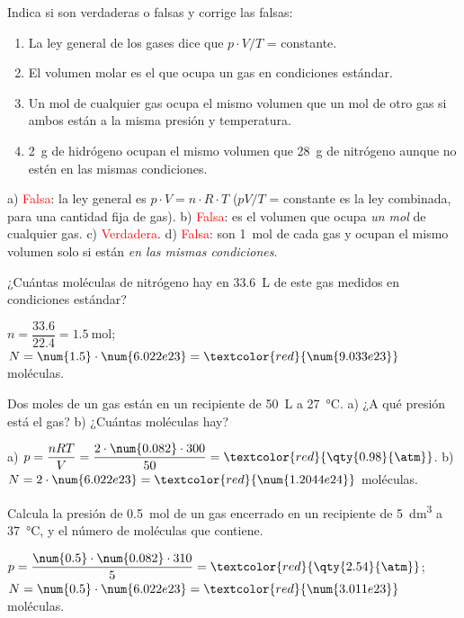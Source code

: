 \begin{exercise}
    Indica si son verdaderas o falsas y corrige las falsas:
    \begin{enumerate}[label=\alph*)]
        \item La ley general de los gases dice que \(p \cdot V / T\) = constante.
        \item El volumen molar es el que ocupa un gas en condiciones estándar.
        \item Un mol de cualquier gas ocupa el mismo volumen que un mol de otro gas si ambos están a la misma presión y temperatura.
        \item \qty{2}{\gram} de hidrógeno ocupan el mismo volumen que \qty{28}{\gram} de nitrógeno aunque no estén en las mismas condiciones.
    \end{enumerate}
    \begin{solu}
        a) \textcolor{red}{Falsa}: la ley general es \(p \cdot V = n \cdot R \cdot T\) (\(pV/T\) = constante es la ley combinada, para una cantidad fija de gas). b) \textcolor{red}{Falsa}: es el volumen que ocupa \emph{un mol} de cualquier gas. c) \textcolor{red}{Verdadera}. d) \textcolor{red}{Falsa}: son \qty{1}{\mol} de cada gas y ocupan el mismo volumen solo si están \emph{en las mismas condiciones}.
    \end{solu}
\end{exercise}

\begin{exercise}
    ¿Cuántas moléculas de nitrógeno hay en \qty{33.6}{\L} de este gas medidos en condiciones estándar?
    \begin{solu}
        \(n = \dfrac{\num{33.6}}{\num{22.4}} = \qty{1.5}{\mol}\); \(N = \num{1.5} \cdot \num{6.022e23} = \textcolor{red}{\num{9.033e23}}\) moléculas.
    \end{solu}
\end{exercise}

\begin{exercise}
    Dos moles de un gas están en un recipiente de \qty{50}{\L} a \qty{27}{\celsius}. a) ¿A qué presión está el gas? b) ¿Cuántas moléculas hay?
    \begin{solu}
        a) \(p = \dfrac{n R T}{V} = \dfrac{2 \cdot \num{0.082} \cdot 300}{50} = \textcolor{red}{\qty{0.98}{\atm}}\). b) \(N = 2 \cdot \num{6.022e23} = \textcolor{red}{\num{1.2044e24}}\) moléculas.
    \end{solu}
\end{exercise}

\begin{exercise}
    Calcula la presión de \qty{0.5}{\mol} de un gas encerrado en un recipiente de \qty{5}{\cubic\deci\metre} a \qty{37}{\celsius}, y el número de moléculas que contiene.
    \begin{solu}
        \(p = \dfrac{\num{0.5} \cdot \num{0.082} \cdot 310}{5} = \textcolor{red}{\qty{2.54}{\atm}}\); \(N = \num{0.5} \cdot \num{6.022e23} = \textcolor{red}{\num{3.011e23}}\) moléculas.
    \end{solu}
\end{exercise}

